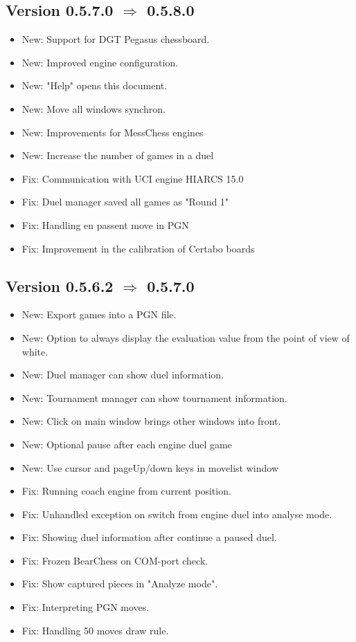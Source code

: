 \documentclass[11pt,a4paper]{article}
\begin{document}
\subsection*{Version 0.5.7.0 $\Rightarrow$  0.5.8.0}
\begin{itemize}
	\item New: Support for DGT Pegasus chessboard.
    \item New: Improved engine configuration.	
    \item New: "Help" opens this document.
	\item New: Move all windows synchron.	
	\item New: Improvements for MessChess engines
	\item New: Increase the number of games in a duel
	\item Fix: Communication with UCI engine HIARCS 15.0
	\item Fix: Duel manager saved all games as "Round 1"
	\item Fix: Handling en passent move in PGN
	\item Fix: Improvement in the calibration of Certabo boards
\end{itemize}

\subsection*{Version 0.5.6.2 $\Rightarrow$  0.5.7.0}
\begin{itemize}
	\item New: Export games into a PGN file.
	\item New: Option to always display the evaluation value from the point of view of white.
	\item New: Duel manager can show duel information.
	\item New: Tournament manager can show tournament information.	
	\item New: Click on main window brings other windows into front.
	\item New: Optional pause after each engine duel game
	\item New: Use cursor and pageUp/down keys in movelist window
	\item Fix: Running coach engine from current position.
	\item Fix: Unhandled exception on switch from engine duel into analyse mode.	
	\item Fix: Showing duel information after continue a paused duel.
	\item Fix: Frozen BearChess on COM-port check.	
	\item Fix: Show captured pieces in "Analyze mode".
	\item Fix: Interpreting PGN moves.
	\item Fix: Handling 50 moves draw rule.
\end{itemize}
\end{document}
